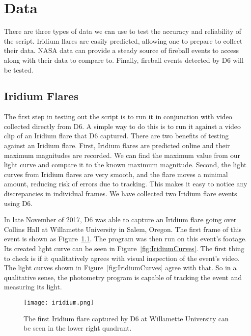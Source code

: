 \chapter{Data}

There are three types of data we can use to test the accuracy and reliability of the script. Iridium flares are easily predicted, allowing one to prepare to collect their data. NASA data can provide a steady source of fireball events to access along with their data to compare to. Finally, fireball events detected by D6 will be tested.

\section{Iridium Flares}

The first step in testing out the script is to run it in conjunction with video collected directly from D6. A simple way to do this is to run it against a video clip of an Iridium flare that D6 captured. There are two benefits of testing against an Iridium flare. First, Iridium flares are predicted online and their maximum magnitudes are recorded. We can find the maximum value from our light curve and compare it to the known maximum magnitude. Second, the light curves from Iridium flares are very smooth, and the flare moves a minimal amount, reducing risk of errors due to tracking. This makes it easy to notice any discrepancies in individual frames. We have collected two Iridium flare events using D6. 

In late November of 2017, D6 was able to capture an Iridium flare going over Collins Hall at Willamette University in Salem, Oregon. The first frame of this event is shown as Figure~\ref{fig:Iridium}. The program was then run on this event's footage. Its created light curve can be seen in Figure~\ref{fig:IridiumCurves}. The first thing to check is if it qualitatively agrees with visual inspection of the event's video. The light curves shown in Figure~\ref{fig:IridiumCurves} agree with that. So in a qualitative sense, the photometry program is capable of tracking the event and measuring its light. 

\begin{figure}[h!]
	\centering
	\texttt{[image: iridium.png]}
	\caption{The first Iridium flare captured by D6 at Willamette University can be seen in the lower right quadrant.}
	\label{fig:Iridium}
\end{figure}

